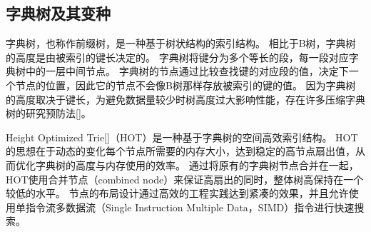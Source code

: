 
\subsection{字典树及其变种}

字典树，也称作前缀树，是一种基于树状结构的索引结构。
相比于B树，字典树的高度是由被索引的键长决定的。
字典树将键分为多个等长的段，每一段对应字典树中的一层中间节点。
字典树的节点通过比较查找键的对应段的值，决定下一个节点的位置，因此它的节点不会像B树那样存放被索引的键的值。
因为字典树的高度取决于键长，为避免数据量较少时树高度过大影响性能，存在许多压缩字典树的研究预防法[]。


Height Optimized Trie[]（HOT）是一种基于字典树的空间高效索引结构。
HOT的思想在于动态的变化每个节点所需要的内存大小，达到稳定的高节点扇出值，从而优化字典树的高度与内存使用的效率。
通过将原有的字典树节点合并在一起，HOT使用合并节点（combined node）来保证高扇出的同时，整体树高保持在一个较低的水平。
节点的布局设计通过高效的工程实践达到紧凑的效果，并且允许使用单指令流多数据流（Single Instruction Multiple Data，SIMD）指令进行快速搜索。

